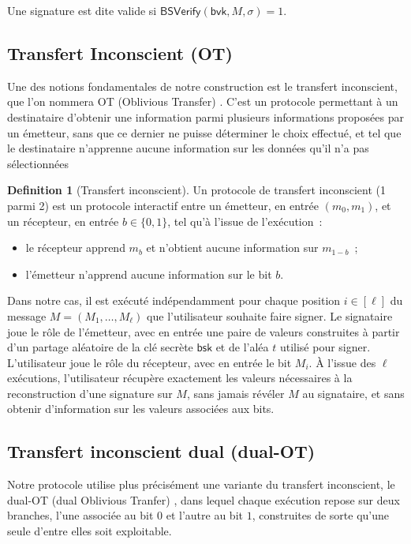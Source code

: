 \documentclass[10pt,a4paper]{article}
\theoremstyle{definition}
\newtheorem{definition}{Definition}[section]
\theoremstyle{plain}
\theoremstyle{remark}
\begin{document}
Une signature est dite valide si
$
\mathsf{BSVerify}(\mathsf{bvk},M,\sigma)=1.
$

\subsection{Transfert Inconscient (OT)}

Une des notions fondamentales de notre construction
est le transfert inconscient, que l'on nommera OT (Oblivious Transfer) \cite{rabin1981}.
C'est un protocole permettant à un destinataire d'obtenir une information 
parmi plusieurs informations proposées par un émetteur,
sans que ce dernier ne puisse déterminer le choix effectué, 
et tel que le destinataire n'apprenne aucune information 
sur les données qu'il n'a pas sélectionnées

\begin{definition}[Transfert inconscient]
Un protocole de transfert inconscient (1 parmi 2) est un protocole interactif entre
un émetteur, en entrée $(m_0,m_1)$, et un récepteur, en entrée $b\in\{0,1\}$, tel
qu'à l'issue de l'exécution~:
\begin{itemize}
    \item le récepteur apprend $m_b$ et n'obtient aucune information sur $m_{1-b}$~;
    \item l'émetteur n'apprend aucune information sur le bit $b$.
\end{itemize}
\end{definition}

Dans notre cas, il est exécuté indépendamment pour chaque position
$i\in[\ell]$ du message $M=(M_1,\ldots,M_\ell)$ que l'utilisateur souhaite faire
signer. Le signataire joue le rôle de l'émetteur, avec en entrée une paire de
valeurs construites à partir d'un partage aléatoire de la clé secrète
$\mathsf{bsk}$ et de l'aléa $t$ utilisé pour signer. L'utilisateur
joue le rôle du récepteur, avec en entrée le bit $M_i$. À l'issue des $\ell$
exécutions, l'utilisateur récupère exactement les valeurs nécessaires à
la reconstruction d'une signature sur $M$, sans jamais révéler $M$ au
signataire, et sans obtenir d'information sur les valeurs associées aux bits.


\subsection{Transfert inconscient dual (dual-OT)}

Notre protocole utilise plus précisément une variante du transfert inconscient,
le dual-OT (dual Oblivious Tranfer) \cite{pvw2007}, dans lequel
chaque exécution repose sur deux branches, l'une associée au bit $0$ et
l'autre au bit $1$, construites de sorte qu'une seule d'entre elles soit exploitable.
\end{document}

